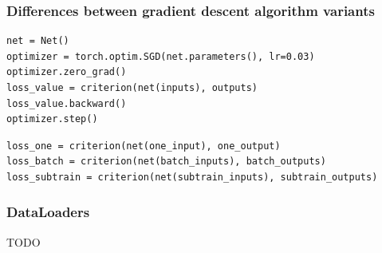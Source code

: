 \documentclass{beamer}
\begin{document}
\begin{frame}[fragile]
  \frametitle{Differences between gradient descent algorithm variants}

\begin{verbatim}
net = Net()
optimizer = torch.optim.SGD(net.parameters(), lr=0.03)
optimizer.zero_grad()
loss_value = criterion(net(inputs), outputs)
loss_value.backward()
optimizer.step()
\end{verbatim}

\begin{verbatim}
loss_one = criterion(net(one_input), one_output)
loss_batch = criterion(net(batch_inputs), batch_outputs)
loss_subtrain = criterion(net(subtrain_inputs), subtrain_outputs)
\end{verbatim}

\end{frame}

\begin{frame}
  \frametitle{DataLoaders}
  TODO 
\end{frame}
\end{document}
